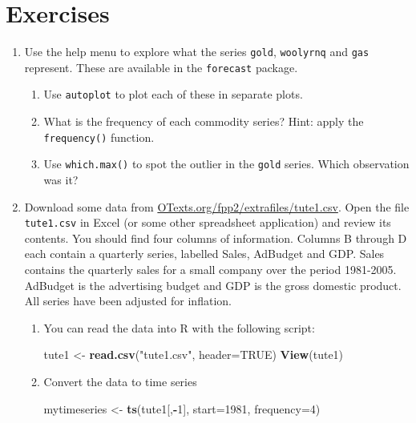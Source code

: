 \documentclass[]{book}
\newenvironment{Shaded}{\begin{snugshade}}{\end{snugshade}}
\newcommand{\DataTypeTok}[1]{\textcolor[rgb]{0.13,0.29,0.53}{#1}}
\newcommand{\DecValTok}[1]{\textcolor[rgb]{0.00,0.00,0.81}{#1}}
\newcommand{\KeywordTok}[1]{\textcolor[rgb]{0.13,0.29,0.53}{\textbf{#1}}}
\newcommand{\NormalTok}[1]{#1}
\newcommand{\OperatorTok}[1]{\textcolor[rgb]{0.81,0.36,0.00}{\textbf{#1}}}
\newcommand{\OtherTok}[1]{\textcolor[rgb]{0.56,0.35,0.01}{#1}}
\newcommand{\StringTok}[1]{\textcolor[rgb]{0.31,0.60,0.02}{#1}}
\providecommand{\tightlist}{%
  \setlength{\itemsep}{0pt}\setlength{\parskip}{0pt}}
\begin{document}
\hypertarget{ex-graphics}{%
\section{Exercises}\label{ex-graphics}}

\begin{enumerate}
\def\labelenumi{\arabic{enumi}.}
\item
  Use the help menu to explore what the series \texttt{gold}, \texttt{woolyrnq} and \texttt{gas} represent. These are available in the \texttt{forecast} package.

  \begin{enumerate}
  \def\labelenumii{\alph{enumii}.}
  \tightlist
  \item
    Use \texttt{autoplot} to plot each of these in separate plots.
  \item
    What is the frequency of each commodity series? Hint: apply the \texttt{frequency()} function.
  \item
    Use \texttt{which.max()} to spot the outlier in the \texttt{gold} series. Which observation was it?
  \end{enumerate}
\item
  Download some data from \href{extrafiles/tute1.csv}{OTexts.org/fpp2/extrafiles/tute1.csv}. Open the file \texttt{tute1.csv} in Excel (or some other spreadsheet application) and review its contents. You should find four columns of information. Columns B through D each contain a quarterly series, labelled Sales, AdBudget and GDP. Sales contains the quarterly sales for a small company over the period 1981-2005. AdBudget is the advertising budget and GDP is the gross domestic product. All series have been adjusted for inflation.

  \begin{enumerate}
  \def\labelenumii{\alph{enumii}.}
  \item
    You can read the data into R with the following script:

\begin{Shaded}
\begin{Highlighting}[]
\NormalTok{tute1 <-}\StringTok{ }\KeywordTok{read.csv}\NormalTok{(}\StringTok{"tute1.csv"}\NormalTok{, }\DataTypeTok{header=}\OtherTok{TRUE}\NormalTok{)}
\KeywordTok{View}\NormalTok{(tute1)}
\end{Highlighting}
\end{Shaded}
  \item
    Convert the data to time series

\begin{Shaded}
\begin{Highlighting}[]
\NormalTok{mytimeseries <-}\StringTok{ }\KeywordTok{ts}\NormalTok{(tute1[,}\OperatorTok{-}\DecValTok{1}\NormalTok{], }\DataTypeTok{start=}\DecValTok{1981}\NormalTok{, }\DataTypeTok{frequency=}\DecValTok{4}\NormalTok{)}
\end{Highlighting}
\end{Shaded}


\end{enumerate}
\end{enumerate}
\end{document}

